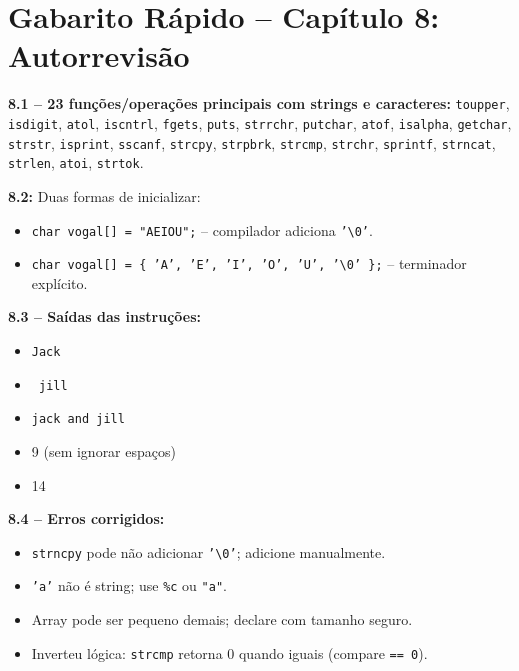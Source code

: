 \documentclass[12pt,a4paper]{article}
\begin{document}
\newpage

\section*{Gabarito Rápido -- Capítulo 8: Autorrevisão}

\begin{tcolorbox}[colback=deitellightblue,colframe=deitelblue,title={\bfseries\large Respostas Resumidas}]

\textbf{8.1 -- 23 funções/operações principais com strings e caracteres:}
\texttt{toupper}, \texttt{isdigit}, \texttt{atol}, \texttt{iscntrl}, \texttt{fgets},
\texttt{puts}, \texttt{strrchr}, \texttt{putchar}, \texttt{atof}, \texttt{isalpha},
\texttt{getchar}, \texttt{strstr}, \texttt{isprint}, \texttt{sscanf}, \texttt{strcpy},
\texttt{strpbrk}, \texttt{strcmp}, \texttt{strchr}, \texttt{sprintf}, \texttt{strncat},
\texttt{strlen}, \texttt{atoi}, \texttt{strtok}.

\medskip\textbf{8.2:} Duas formas de inicializar:
\begin{itemize}[noitemsep]
  \item \texttt{char vogal[] = "AEIOU";} -- compilador adiciona \texttt{'\textbackslash 0'}.
  \item \texttt{char vogal[] = \{ 'A', 'E', 'I', 'O', 'U', '\textbackslash 0' \};} -- terminador explícito.
\end{itemize}

\medskip\textbf{8.3 -- Saídas das instruções:}
\begin{itemize}[noitemsep]
  \item[a)] \texttt{Jack}
  \item[b)] \texttt{ jill}
  \item[c)] \texttt{jack and  jill}
  \item[d)] 9 (sem ignorar espaços)
  \item[e)] 14
\end{itemize}

\medskip\textbf{8.4 -- Erros corrigidos:}
\begin{itemize}[noitemsep]
  \item[a)] \texttt{strncpy} pode não adicionar \texttt{'\textbackslash 0'}; adicione manualmente.
  \item[b)] \texttt{'a'} não é string; use \texttt{\%c} ou \texttt{"a"}.
  \item[c)] Array pode ser pequeno demais; declare com tamanho seguro.
  \item[d)] Inverteu lógica: \texttt{strcmp} retorna 0 quando iguais (compare \texttt{== 0}).
\end{itemize}

\end{tcolorbox}
\end{document}
